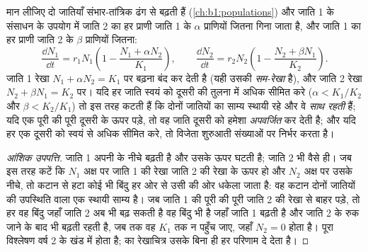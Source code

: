 \begin{proposition}[लोटका--वोल्तेरा स्पर्धा प्रतिरूप]\label{prop:b1:species-interactions:lotka}
मान लीजिए दो जातियाँ संभार-तांत्रिक ढंग से बढ़ती हैं
(\cref{ch:b1:populations}) और जाति 1 के संसाधन के उपयोग में जाति 2 का हर
प्राणी जाति 1 के $\alpha$ प्राणियों जितना गिना जाता है, और जाति 1 का हर
प्राणी जाति 2 के $\beta$ प्राणियों जितना:
\[
\frac{\dd N_1}{\dd t} = r_1 N_1\left(1 - \frac{N_1 + \alpha N_2}{K_1}\right),
\qquad
\frac{\dd N_2}{\dd t} = r_2 N_2\left(1 - \frac{N_2 + \beta N_1}{K_2}\right).
\]
जाति 1 रेखा $N_1 + \alpha N_2 = K_1$ पर बढ़ना बंद कर देती है (यही उसकी
\emph{सम-रेखा} है), और जाति 2 रेखा $N_2 + \beta N_1 = K_2$ पर। यदि
हर जाति स्वयं को दूसरी की तुलना में अधिक सीमित करे ($\alpha <
K_1/K_2$ और $\beta < K_2/K_1$) तो  इस तरह कटती हैं कि दोनों
जातियों का साम्य स्थायी रहे और वे \emph{साथ रहती} हैं; यदि एक 
पूरी की पूरी दूसरी के ऊपर पड़े, तो वह जाति दूसरी को हमेशा
\emph{अपवर्जित} कर देती है; और यदि हर एक दूसरी को स्वयं से अधिक सीमित
करे, तो विजेता शुरुआती संख्याओं पर निर्भर करता है।
\end{proposition}
\begin{proof}[आंशिक उपपत्ति]
जाति 1 अपनी  के नीचे बढ़ती है और उसके ऊपर घटती है; जाति 2 भी
वैसे ही। जब  इस तरह कटें कि $N_1$ अक्ष पर जाति 1 की रेखा जाति
2 की रेखा के ऊपर हो और $N_2$ अक्ष पर उसके नीचे, तो कटान से हटा कोई भी
बिंदु हर ओर से उसी की ओर धकेला जाता है: वह कटान दोनों जातियों की
उपस्थिति वाला एक स्थायी साम्य है। जब जाति 1 की  पूरी की पूरी जाति
2 की रेखा से बाहर पड़े, तो हर वह बिंदु जहाँ जाति 2 अब भी बढ़ सकती है वह
बिंदु भी है जहाँ जाति 1 बढ़ती है और जाति 2 के रुक जाने के बाद भी बढ़ती
रहती है, जब तक वह $K_1$ तक न पहुँच जाए, जहाँ $N_2 = 0$ होता है। पूरा विश्लेषण
वर्ष 2 के खंड में होता है;  का रेखाचित्र उसके बिना ही हर
परिणाम दे देता है।
\end{proof}

